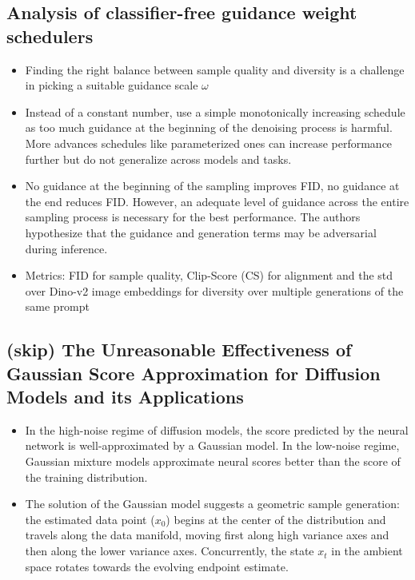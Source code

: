 \documentclass{article}
\begin{document}
\subsection{Analysis of classifier-free guidance weight schedulers}
\begin{itemize}
    \item Finding the right balance between sample quality and diversity is a challenge in picking a suitable guidance scale $\omega$
    \item Instead of a constant number, use a simple monotonically increasing schedule as too much guidance at the beginning of the denoising process is harmful. More advances schedules like parameterized ones can increase performance further but do not generalize across models and tasks.
    \item No guidance at the beginning of the sampling improves FID, no guidance at the end reduces FID. However, an adequate level of guidance across the entire sampling process is necessary for the best performance. The authors hypothesize that the guidance and generation terms may be adversarial during inference.
    \item Metrics: FID for sample quality, Clip-Score (CS) for alignment and the std over Dino-v2 image embeddings for diversity over multiple generations of the same prompt
\end{itemize}

\subsection{(skip) The Unreasonable Effectiveness of Gaussian Score Approximation for Diffusion Models and its Applications}
\begin{itemize}
    \item In the high-noise regime of diffusion models, the score predicted by the neural network is well-approximated by a Gaussian model. In the low-noise regime, Gaussian mixture models approximate neural scores better than the score of the training distribution.
    \item The solution of the Gaussian model suggests a geometric sample generation: the estimated data point ($x_0$) begins at the center of the distribution and travels along the data manifold, moving first along high variance axes and then along the lower variance axes. Concurrently, the state $x_t$ in the ambient space rotates towards the evolving endpoint estimate. 
\end{itemize}
\end{document}
